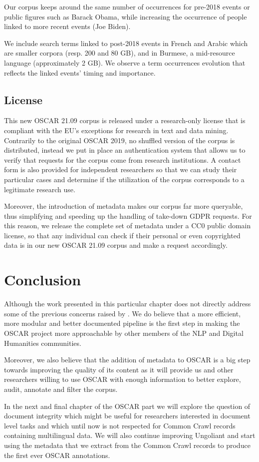 Our corpus keeps around the same number of occurrences for pre-2018 events or public figures such as Barack Obama, while increasing the occurrence of people linked to more recent events (Joe Biden).

We include search terms linked to post-2018 events in French and Arabic which are smaller corpora (resp. 200 and 80 GB), and in Burmese, a mid-resource language (approximately 2 GB). We observe a term occurrences evolution that reflects the linked events' timing and importance.

\subsection{License}

This new OSCAR 21.09 corpus is released under a research-only license that is compliant with the EU's exceptions for research in text and data mining. Contrarily to the original OSCAR 2019, no shuffled version of the corpus is distributed, instead we put in place an authentication system that allows us to verify that requests for the corpus come from research institutions. A contact form is also provided for independent researchers so that we can study their particular cases and determine if the utilization of the corpus corresponds to a legitimate research use.

Moreover, the introduction of metadata makes our corpus far more queryable, thus simplifying and speeding up the handling of take-down GDPR requests. For this reason, we release the complete set of metadata under a CC0 public domain license, so that any individual can check if their personal or even copyrighted data is in our new OSCAR 21.09 corpus and make a request accordingly.

\section{Conclusion}

Although the work presented in this particular chapter does not directly address some of the previous concerns raised by \citet{caswell-etal-2020-language,kreutzer-etal-2021-quality}. We do believe that a more efficient, more modular and better documented pipeline is the first step in making the OSCAR project more approachable by other members of the NLP and Digital Humanities communities.

Moreover, we also believe that the addition of metadata to OSCAR is a big step towards improving the quality of its content as it will provide us and other researchers willing to use OSCAR with enough information to better explore, audit, annotate and filter the corpus.

In the next and final chapter of the OSCAR part we will explore the question of document integrity which might be useful for researchers interested in document level tasks and which until now is not respected for Common Crawl records containing multilingual data. We will also continue improving Ungoliant and start using the metadata that we extract from the Common Crawl records to produce the first ever OSCAR annotations.